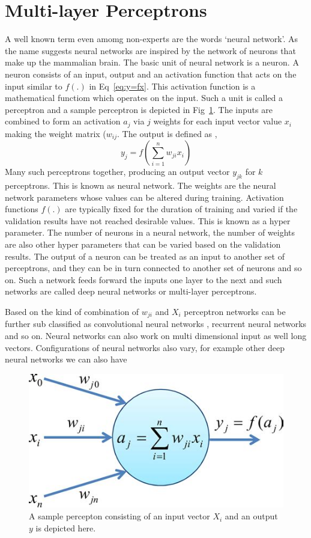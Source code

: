 \section{Multi-layer Perceptrons}
A well known term even amomg non-experts are the words `neural network'.
As the name suggests neural networks are inspired by the network of neurons that make up the mammalian brain.
The basic unit of neural network is a neuron.
A neuron consists of an input, output and an activation function that acts on the input similar to $f(.)$ in Eq~\ref{eq:y=fx}.
This activation function is a mathematical functiom which operates on the input.
Such a unit is called a perceptron and a sample perceptron is depicted in Fig~\ref{fig:perceptron}.
The inputs are combined to form an activation $a_{j}$ via $j$ weights for each input vector value $x_{i}$ making the weight matrix ($w_{ij}$.
The output is defined as ,
\begin{equation}
    y_j = f(\sum_{i=1}^{n} w_{ji}x_i)
    \label{eq: perceptron}
\end{equation}
Many such perceptrons together, producing an output vector $y_{jk}$ for $k$ perceptrons.
This is known as neural network. 
The weights are the neural network parameters whose values can be altered during training.
Activation functions $f(.)$ are typically fixed for the duration of training and varied if the validation results have not reached desirable values.
This is known as a hyper parameter.
The number of neurons in a neural network, the number of weights are also other hyper parameters that can be varied based on the validation results.
The output of a neuron can be treated as an input to another set of perceptrons, and they can be in turn connected to another set of neurons and so on.
Such a network feeds forward the inputs one layer to the next and such networks are called deep neural networks or multi-layer perceptrons.

Based on the kind of combination of $w_{ji}$ and $X_{i}$ perceptron networks can be further sub classified as convolutional neural networks \citep[][]{1990ZhangCNN}, recurrent neural networks and so on.
Neural networks can also work on multi dimensional input as well long vectors.
Configurations of neural networks also vary, for example  other deep neural networks we can also have 

\begin{figure}
    \centering
    \includegraphics[scale=0.5]{images/Chapter3/perceptron.jpg}
    \caption{A sample percepton consisting of an input vector $X_{i}$ and an output $y$ is depicted here.}
    \label{fig:perceptron}
\end{figure}

